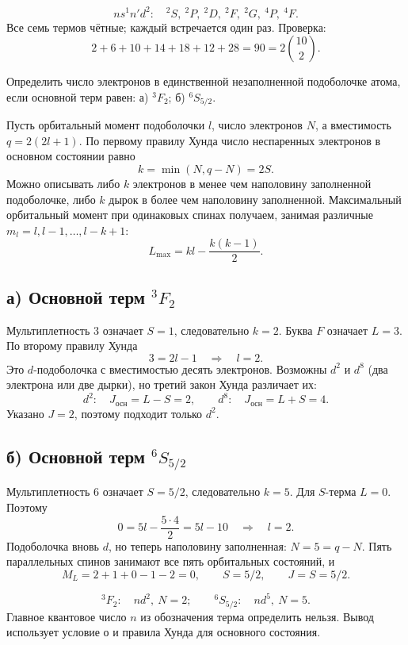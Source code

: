 \documentclass[../final.tex]{subfiles}
\begin{document}
\answer
\[
    ns^1n'd^2:\quad {}^2S,\ {}^2P,\ {}^2D,\ {}^2F,\ {}^2G,\ {}^4P,\ {}^4F.
\]
Все семь термов чётные; каждый встречается один раз.
Проверка:
\[
    2+6+10+14+18+12+28=90=2\binom{10}2.
\]

\clearpage
{}

\condition
Определить число электронов в единственной незаполненной
подоболочке атома, если основной терм равен:
а) ${}^3F_2$; б) ${}^6S_{5/2}$.

\solution
Пусть орбитальный момент подоболочки $l$, число электронов $N$,
а вместимость $q=2(2l+1)$. По первому правилу Хунда число
неспаренных электронов в основном состоянии равно
\[
    k=\min(N,q-N)=2S.
\]
Можно описывать либо $k$ электронов в менее чем наполовину
заполненной подоболочке, либо $k$ дырок в более чем наполовину
заполненной. Максимальный орбитальный момент при одинаковых
спинах получаем, занимая различные $m_l=l,l-1,\ldots,l-k+1$:
\[
    L_{\max}=kl-\frac{k(k-1)}2.
\]

\subsection*{а) Основной терм \texorpdfstring{${}^3F_2$}{3F2}}
Мультиплетность $3$ означает $S=1$, следовательно $k=2$.
Буква $F$ означает $L=3$. По второму правилу Хунда
\[
    3=2l-1\quad\Rightarrow\quad l=2.
\]
Это $d$-подоболочка с вместимостью десять электронов.
Возможны $d^2$ и $d^8$ (два электрона или две дырки), но
третий закон Хунда различает их:
\[
    d^2:\quad J_{\text{осн}}=L-S=2,\qquad
    d^8:\quad J_{\text{осн}}=L+S=4.
\]
Указано $J=2$, поэтому подходит только $d^2$.

\subsection*{б) Основной терм \texorpdfstring{${}^6S_{5/2}$}{6S5/2}}
Мультиплетность $6$ означает $S=5/2$, следовательно $k=5$.
Для $S$-терма $L=0$. Поэтому
\[
    0=5l-\frac{5\cdot4}2=5l-10\quad\Rightarrow\quad l=2.
\]
Подоболочка вновь $d$, но теперь наполовину заполненная:
$N=5=q-N$. Пять параллельных спинов занимают все пять
орбитальных состояний, и
\[
    M_L=2+1+0-1-2=0,\qquad S=5/2,\qquad J=S=5/2.
\]

\answer
\[
    {}^3F_2:\quad nd^2,\ N=2;\qquad
    {}^6S_{5/2}:\quad nd^5,\ N=5.
\]
Главное квантовое число $n$ из обозначения терма определить нельзя.
Вывод использует условие о  и правила Хунда для основного состояния.
\end{document}
